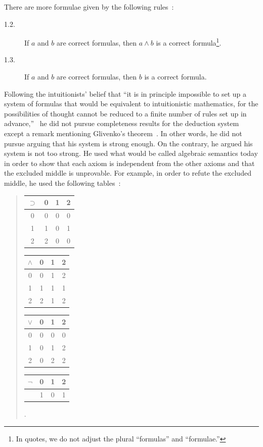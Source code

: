There are more formulae given by the following rules~\cite{heyting1930}:
\begin{description}
 \item[1.2.] If $a$ and $b$ are correct formulas, then $a\land b$ is a correct
       formula\footnote{In quotes, we do not adjust the plural
      ``formulas'' and ``formulae.'' }.
 \item[1.3.] If $a$ and $b$ are correct formulas, then $b$ is a correct formula.
\end{description}

Following the intuitionists' belief
that ``it is in principle impossible to set up a system of formulas that
would be equivalent to intuitionistic mathematics, for the
possibilities of thought cannot be reduced to a finite number of rules
set up in advance,''~\citep{heyting1930} he did not pursue completeness
results for the deduction system
except a remark mentioning Glivenko's
theorem~\citep{glivenko0,glivenko1}.
In other words, he did not pursue arguing that his system is strong
enough.
On the contrary, he argued his system is not too strong.
He used what would be called algebraic semantics today
in order to show that
each axiom is independent from the other axioms and that
the excluded middle is unprovable.
For example, in order to refute the excluded middle, he used the
following tables~\citep{heyting1930}:\\
 \begin{quotation}
 \begin{center}
  \begin{tabular}{c|ccc}
   $\supset $& 0  & 1  & 2 \\ \hline
   0 & 0 & 0 & 0 \\
   1 & 1 & 0 & 1 \\
   2 & 2 & 0 & 0
  \end{tabular}
  \hfill
  \begin{tabular}{c|ccc}
   $\wedge $& 0 & 1& 2\\ \hline
   0 & 0 & 1 & 2\\
   1 & 1 & 1 & 1\\
   2 & 2 & 1 & 2\\
  \end{tabular}
  \hfill
  \begin{tabular}{c|ccc}
   $\vee$& 0 & 1 & 2\\ \hline
   0 & 0 & 0 & 0 \\
   1 & 0 & 1 & 2 \\
   2 & 0 & 2 & 2\\
  \end{tabular}
  \hfill
  \begin{tabular}{c|ccc}
   $\neg $& 0 & 1 & 2\\ \hline
   & 1 & 0 & 1\\
  \end{tabular}\enspace.
 \end{center}
 \end{quotation}
